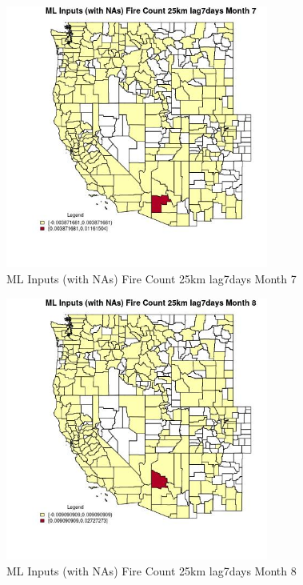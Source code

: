 \begin{figure} 
\centering  
\includegraphics[width=0.77\textwidth]{Code_Outputs/Report_ML_input_PM25_Step4_part_e_de_duplicated_aves_compiled_2019-05-20wNAs_CountyFire_Count_25km_lag7daysmedianMonth7.jpg} 
\caption{\label{fig:Report_ML_input_PM25_Step4_part_e_de_duplicated_aves_compiled_2019-05-20wNAsCountyFire_Count_25km_lag7daysmedianMonth7}ML Inputs (with NAs) Fire Count 25km lag7days Month 7} 
\end{figure} 
 

\begin{figure} 
\centering  
\includegraphics[width=0.77\textwidth]{Code_Outputs/Report_ML_input_PM25_Step4_part_e_de_duplicated_aves_compiled_2019-05-20wNAs_CountyFire_Count_25km_lag7daysmedianMonth8.jpg} 
\caption{\label{fig:Report_ML_input_PM25_Step4_part_e_de_duplicated_aves_compiled_2019-05-20wNAsCountyFire_Count_25km_lag7daysmedianMonth8}ML Inputs (with NAs) Fire Count 25km lag7days Month 8} 
\end{figure} 
 

